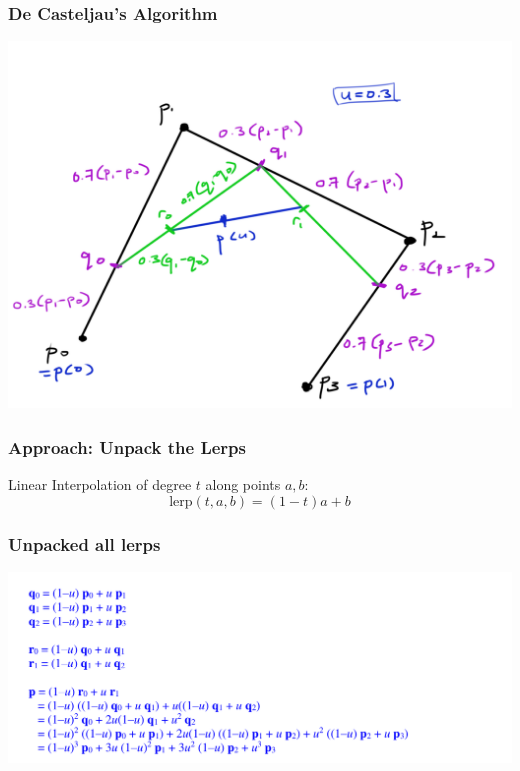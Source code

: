 \documentclass{beamer}
\begin{document}
\begin{frame}
    \frametitle{De Casteljau's Algorithm}

    \begin{center}
        \includegraphics[scale=0.4]{q9-decasteljau.png}
    \end{center}

\end{frame}

\begin{frame}
    \frametitle{Approach: Unpack the Lerps}

    \begin{tcolorbox}
        Linear Interpolation of degree $t$ along points $a, b$:
        \begin{equation}
            \mathrm{lerp}(t, a, b) = (1 - t)a + b
        \end{equation}
    \end{tcolorbox}

\end{frame}

\begin{frame}
    \frametitle{Unpacked all lerps}

    \begin{center}
        \includegraphics[width=\linewidth]{derive-bezier.png}
    \end{center}

\end{frame}
\end{document}

